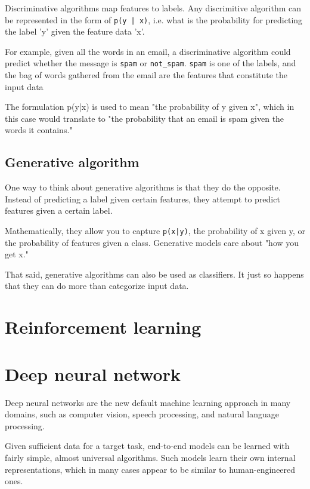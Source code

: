 Discriminative algorithms map features to labels. Any discrimitive algorithm can
be represented in the form of \verb!p(y | x)!, i.e. what is the probability for
predicting the label 'y' given the feature data 'x'.

For example, given all the words in an email, a discriminative algorithm could
predict whether the message is \verb!spam! or \verb!not_spam!. \verb!spam! is
one of the labels, and the bag of words gathered from the email are the features
that constitute the input data

The formulation p(y|x) is used to mean "the probability of y given x", which in
this case would translate to "the probability that an email is spam given the
words it contains."

\subsection{Generative algorithm}
\label{sec:generative-algorithm}
One way to think about generative algorithms is that they do the opposite.
Instead of predicting a label given certain features, they attempt to predict
features given a certain label.

Mathematically, they allow you to capture \verb!p(x|y)!, the probability of x
given y, or the probability of features given a class. 
Generative models care about "how you get x."

\begin{mdframed}
That said, generative algorithms can also be used as classifiers. It just so
happens that they can do more than categorize input data.
\end{mdframed}

\section{Reinforcement learning}

\section{Deep neural network}
\label{sec:deep-neural-network}


Deep neural networks are the new default machine learning approach in many
domains, such as computer vision, speech processing, and natural language
processing.

Given sufficient data for a target task, end-to-end models can be learned with
fairly simple, almost universal algorithms. Such models learn their own internal
representations, which in many cases appear to be similar to human-engineered
ones.


